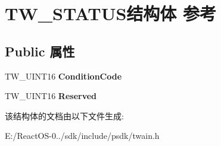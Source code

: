 \hypertarget{struct_t_w___s_t_a_t_u_s}{}\section{T\+W\+\_\+\+S\+T\+A\+T\+U\+S结构体 参考}
\label{struct_t_w___s_t_a_t_u_s}
\subsection*{Public 属性}
\begin{DoxyCompactItemize}
\item 
\mbox{\label{struct_t_w___s_t_a_t_u_s_a7fca01721d88d8038218f460f5c24a87}} 
T\+W\+\_\+\+U\+I\+N\+T16 {\bfseries Condition\+Code}
\item 
\mbox{\label{struct_t_w___s_t_a_t_u_s_a5a1ee032c96b15fa56d3cd3b94f906ad}} 
T\+W\+\_\+\+U\+I\+N\+T16 {\bfseries Reserved}
\end{DoxyCompactItemize}


该结构体的文档由以下文件生成\+:\begin{DoxyCompactItemize}
\item 
E\+:/\+React\+O\+S-\/0../sdk/include/psdk/twain.\+h\end{DoxyCompactItemize}
